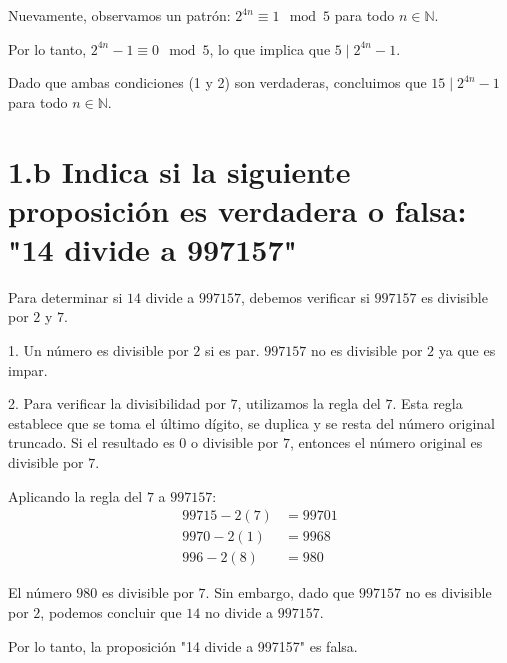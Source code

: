\documentclass{article}
\begin{document}
Nuevamente, observamos un patrón: $2^{4n} \equiv 1 \mod 5$ para todo $n \in \mathbb{N}$.

Por lo tanto, $2^{4n} - 1 \equiv 0 \mod 5$, lo que implica que $5 \mid 2^{4n} - 1$.

Dado que ambas condiciones (1 y 2) son verdaderas, concluimos que $15 \mid 2^{4n} - 1$ para todo $n \in \mathbb{N}$.

\section*{1.b Indica si la siguiente proposición es verdadera o falsa: "14 divide a 997157"}    

Para determinar si $14$ divide a $997157$, debemos verificar si $997157$ es divisible por $2$ y $7$. 

1. Un número es divisible por $2$ si es par. $997157$ no es divisible por $2$ ya que es impar.

2. Para verificar la divisibilidad por $7$, utilizamos la regla del $7$. Esta regla establece que se toma el último dígito, se duplica y se resta del número original truncado. Si el resultado es $0$ o divisible por $7$, entonces el número original es divisible por $7$. 

Aplicando la regla del $7$ a $997157$:
\begin{align*}
99715 - 2(7) &= 99701 \\
9970 - 2(1) &= 9968 \\
996 - 2(8) &= 980
\end{align*}

El número $980$ es divisible por $7$. Sin embargo, dado que $997157$ no es divisible por $2$, podemos concluir que $14$ no divide a $997157$.

Por lo tanto, la proposición "14 divide a 997157" es falsa.
\end{document}
